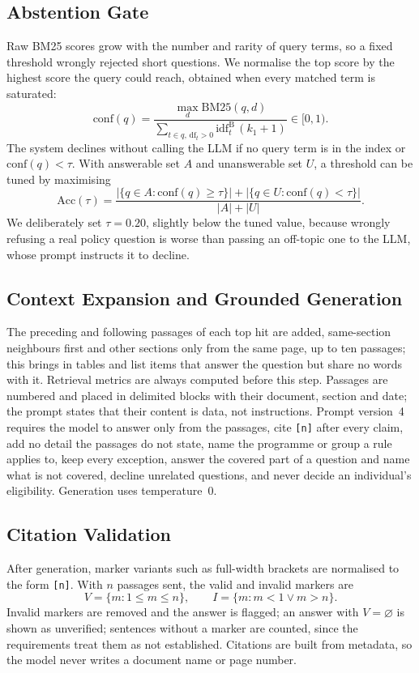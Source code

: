 \documentclass[conference]{IEEEtran}
\newcommand{\code}[1]{\texttt{#1}}
\begin{document}
\subsection{Abstention Gate}
Raw BM25 scores grow with the number and rarity of query terms, so a fixed threshold wrongly rejected short questions. We normalise the top score by the highest score the query could reach, obtained when every matched term is saturated:
\begin{equation}
\mathrm{conf}(q)=\frac{\max_d \mathrm{BM25}(q,d)}{\sum_{t\in q,\,\mathrm{df}_t>0}\mathrm{idf}^{\mathrm{B}}_t\,(k_1+1)}\in[0,1). \label{eq:conf}
\end{equation}
The system declines without calling the LLM if no query term is in the index or $\mathrm{conf}(q)<\tau$. With answerable set $A$ and unanswerable set $U$, a threshold can be tuned by maximising
\begin{equation}
\mathrm{Acc}(\tau)=\frac{|\{q\in A:\mathrm{conf}(q)\geq\tau\}|+|\{q\in U:\mathrm{conf}(q)<\tau\}|}{|A|+|U|}. \label{eq:tau}
\end{equation}
We deliberately set $\tau=0.20$, slightly below the tuned value, because wrongly refusing a real policy question is worse than passing an off-topic one to the LLM, whose prompt instructs it to decline.

\subsection{Context Expansion and Grounded Generation}
The preceding and following passages of each top hit are added, same-section neighbours first and other sections only from the same page, up to ten passages; this brings in tables and list items that answer the question but share no words with it. Retrieval metrics are always computed before this step. Passages are numbered and placed in delimited blocks with their document, section and date; the prompt states that their content is data, not instructions. Prompt version~4 requires the model to answer only from the passages, cite \code{[n]} after every claim, add no detail the passages do not state, name the programme or group a rule applies to, keep every exception, answer the covered part of a question and name what is not covered, decline unrelated questions, and never decide an individual's eligibility. Generation uses temperature~0.

\subsection{Citation Validation}
After generation, marker variants such as full-width brackets are normalised to the form \code{[n]}. With $n$ passages sent, the valid and invalid markers are
\begin{equation}
V=\{m:1\leq m\leq n\},\qquad I=\{m: m<1 \lor m>n\}. \label{eq:valid}
\end{equation}
Invalid markers are removed and the answer is flagged; an answer with $V=\varnothing$ is shown as unverified; sentences without a marker are counted, since the requirements treat them as not established. Citations are built from metadata, so the model never writes a document name or page number.
\end{document}
